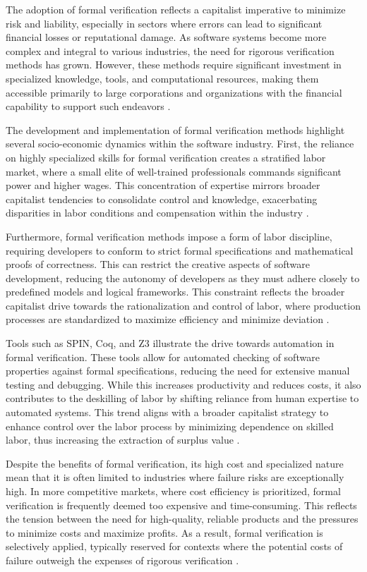 \begin{refsection}
The adoption of formal verification reflects a capitalist imperative to minimize risk and liability, especially in sectors where errors can lead to significant financial losses or reputational damage. As software systems become more complex and integral to various industries, the need for rigorous verification methods has grown. However, these methods require significant investment in specialized knowledge, tools, and computational resources, making them accessible primarily to large corporations and organizations with the financial capability to support such endeavors \cite[pp.~5-10]{jackson2000alloy}.

The development and implementation of formal verification methods highlight several socio-economic dynamics within the software industry. First, the reliance on highly specialized skills for formal verification creates a stratified labor market, where a small elite of well-trained professionals commands significant power and higher wages. This concentration of expertise mirrors broader capitalist tendencies to consolidate control and knowledge, exacerbating disparities in labor conditions and compensation within the industry \cite[pp.~118-123]{huws2014labor}.

Furthermore, formal verification methods impose a form of labor discipline, requiring developers to conform to strict formal specifications and mathematical proofs of correctness. This can restrict the creative aspects of software development, reducing the autonomy of developers as they must adhere closely to predefined models and logical frameworks. This constraint reflects the broader capitalist drive towards the rationalization and control of labor, where production processes are standardized to maximize efficiency and minimize deviation \cite[pp.~152-157]{braverman1974labor}.

Tools such as SPIN, Coq, and Z3 illustrate the drive towards automation in formal verification. These tools allow for automated checking of software properties against formal specifications, reducing the need for extensive manual testing and debugging. While this increases productivity and reduces costs, it also contributes to the deskilling of labor by shifting reliance from human expertise to automated systems. This trend aligns with a broader capitalist strategy to enhance control over the labor process by minimizing dependence on skilled labor, thus increasing the extraction of surplus value \cite[pp.~490-499]{marx2008capital}.

Despite the benefits of formal verification, its high cost and specialized nature mean that it is often limited to industries where failure risks are exceptionally high. In more competitive markets, where cost efficiency is prioritized, formal verification is frequently deemed too expensive and time-consuming. This reflects the tension between the need for high-quality, reliable products and the pressures to minimize costs and maximize profits. As a result, formal verification is selectively applied, typically reserved for contexts where the potential costs of failure outweigh the expenses of rigorous verification \cite[pp.~10-15]{hoare1985communicating}.


\end{refsection}
